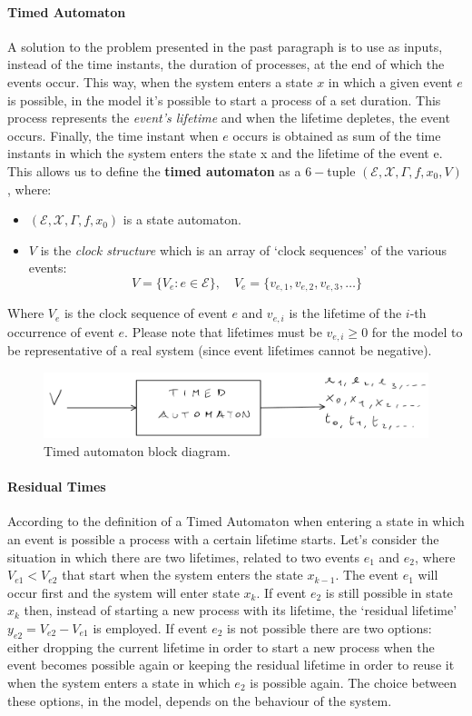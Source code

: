 \documentclass[12pt,a4paper]{article}
\begin{document}
\paragraph{Timed Automaton}
A solution to the problem presented in the past paragraph is to use as inputs, instead of the time instants, the duration of processes, at the end of which the events occur. This way, when the system enters a state $x$ in which a given event $e$ is possible, in the model it’s possible to start a process of a set duration. This process represents the \textit{event's lifetime} and when the lifetime depletes, the event occurs. Finally, the time instant when $e$ occurs is obtained as sum of the time instants in which the system enters the state x and the lifetime of the event e.
This allows us to define the \textbf{timed automaton} as a $6-$tuple $(\mathcal{E},\mathcal{X},\Gamma,f,x_0,V)$, where: 
\begin{itemize}
\item $(\mathcal{E},\mathcal{X},\Gamma,f,x_0)$ is a state automaton. 
\item $V$ is the \textit{clock structure} which is an array of `clock sequences’ of the various events:
$$
V=\{V_e : e\in\mathcal{E}\}, \quad V_e=\{v_{e,1}, v_{e,2}, v_{e,3},\dots\}
$$
\end{itemize}	
\noindent
Where $V_e$ is the clock sequence of event $e$ and $v_{e,i}$ is the lifetime of the $i$-th occurrence of event $e$. Please note that lifetimes must be $v_{e,i} \ge 0$ for the model to be representative of a real system (since event lifetimes cannot be negative).

\begin{figure}[H]
	\centering
	\includegraphics[width=\textwidth]{IMG/timedAut.png}
	\caption{Timed automaton block diagram.}
	\label{fig:timedAut}
\end{figure}

\paragraph{Residual Times} According to the definition of a Timed Automaton when entering a state in which an event is possible a process with a certain lifetime starts. Let’s consider the situation in which there are two lifetimes, related to two events $e_1$ and $e_2$, where $V_{e1}<V_{e2}$ that start when the system enters the state $x_{k-1}$. The event $e_1$ will occur first and the system will enter state $x_k$. If event $e_2$ is still possible in state $x_k$ then, instead of starting a new process with its lifetime, the `residual lifetime’ $y_{e2}=V_{e2}-V_{e1}$ is employed. If event $e_2$ is not possible there are two options: either dropping the current lifetime in order to start a new process when the event becomes possible again or keeping the residual lifetime in order to reuse it when the system enters a state in which $e_2$ is possible again. The choice between these options, in the model, depends on the behaviour of the system.
\end{document}
